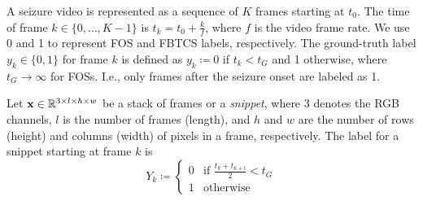A seizure video is represented as a sequence of $K$ frames starting at $t_0$.
The time of frame $k \in \{ 0, \dots, K - 1 \}$ is ${t_k = t_0 + \frac{k}{f}}$, where $f$ is the video frame rate.
We use 0 and 1 to represent \ac{FOS} and \ac{FBTCS} labels, respectively.
The ground-truth label $y_k \in \{0, 1\}$ for frame $k$ is defined as $y_k \coloneqq 0$ if $t_k < t_G$ and 1 otherwise, where $t_G \rightarrow \infty$ for \acp{FOS}. I.e., only frames after the seizure onset are labeled as 1.

Let $\mathbf{x} \in \mathbb{R} ^ {3 \times l \times h \times w}$ be a stack of frames or a \textit{snippet}, where
$3$ denotes the \ac{RGB} channels,
$l$ is the number of frames (length),
and $h$ and $w$ are the number of rows (height) and columns (width) of pixels in a frame, respectively.
The label for a snippet starting at frame $k$ is
\begin{equation}
  Y_k \coloneqq
  \left\{
    \begin{array}{ll}
      0 & \mbox{if } \frac{t_k + t_{k + l}}{2} < t_G \\
      1 & \mbox{otherwise}
    \end{array}
  \right.
\end{equation}
